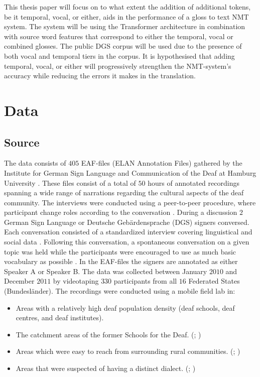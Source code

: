This thesis paper will focus on to what extent the addition of additional tokens, be it temporal, vocal, or either, aids in the performance of a gloss to text NMT system. The system will be using the Transformer architecture in combination with source word features \cite{garcia2016factored} that correspond to either the temporal, vocal or combined glosses. The public DGS corpus \cite{dgscorpus_3} will be used due to the presence of both vocal and temporal tiers in the corpus. It is hypothesised that adding temporal, vocal, or either will progressively strengthen the NMT-system's accuracy while reducing the errors it makes in the translation.


\section{Data}


\subsection{Source}

The data consists of $405$ EAF-files (ELAN Annotation Files) gathered by the Institute for German Sign Language and Communication of the Deaf at Hamburg University \cite{prillwitz2008dgs}. These files consist of a total of $50$ hours of annotated recordings spanning a wide range of narrations regarding the cultural aspects of the deaf community. The interviews were conducted using a peer-to-peer procedure, where participant change roles according to the conversation \cite{prillwitz2008dgs}. During a discussion $2$ German Sign Language or Deutsche Gebärdensprache (DGS) signers conversed. Each conversation consisted of a standardized interview covering linguistical and social data \cite{deaf_areas}. Following this conversation, a spontaneous conversation on a given topic was held while the participants were encouraged to use as much basic vocabulary as possible \cite{deaf_areas}. In the EAF-files the signers are annotated as either Speaker A or Speaker B. The data was collected between January $2010$ and December $2011$  by videotaping $330$ participants from all $16$ Federated States (Bundesländer). The recordings were conducted using a mobile field lab in:

\begin{itemize}
  \item Areas with a relatively high deaf population density (deaf schools, deaf centres, and deaf institutes). \cite{age_data_hamburg} \cite{deaf_areas}
  \item The catchment areas of the former Schools for the Deaf. (\citealp{age_data_hamburg}; \citealp{prillwitz2008dgs})
  \item Areas which were easy to reach from surrounding rural communities. (\citealp{age_data_hamburg}; \citealp{deaf_areas})
  \item Areas that were suspected of having a distinct dialect. (\citealp{age_data_hamburg}; \citealp{prillwitz2008dgs})
\end{itemize}

